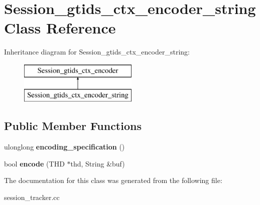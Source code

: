 \hypertarget{classSession__gtids__ctx__encoder__string}{}\section{Session\+\_\+gtids\+\_\+ctx\+\_\+encoder\+\_\+string Class Reference}
\label{classSession__gtids__ctx__encoder__string}
Inheritance diagram for Session\+\_\+gtids\+\_\+ctx\+\_\+encoder\+\_\+string\+:\begin{figure}[H]
\begin{center}
\leavevmode
\includegraphics[height=2.000000cm]{classSession__gtids__ctx__encoder__string}
\end{center}
\end{figure}
\subsection*{Public Member Functions}
\begin{DoxyCompactItemize}
\item 
\mbox{\label{classSession__gtids__ctx__encoder__string_ae320cfea71e18f55fd85bc4461575a34}} 
ulonglong {\bfseries encoding\+\_\+specification} ()
\item 
\mbox{\label{classSession__gtids__ctx__encoder__string_af7a5bfa5a548ca30d4de3c91b207c01f}} 
bool {\bfseries encode} (T\+HD $\ast$thd, String \&buf)
\end{DoxyCompactItemize}


The documentation for this class was generated from the following file\+:\begin{DoxyCompactItemize}
\item 
session\+\_\+tracker.\+cc\end{DoxyCompactItemize}
